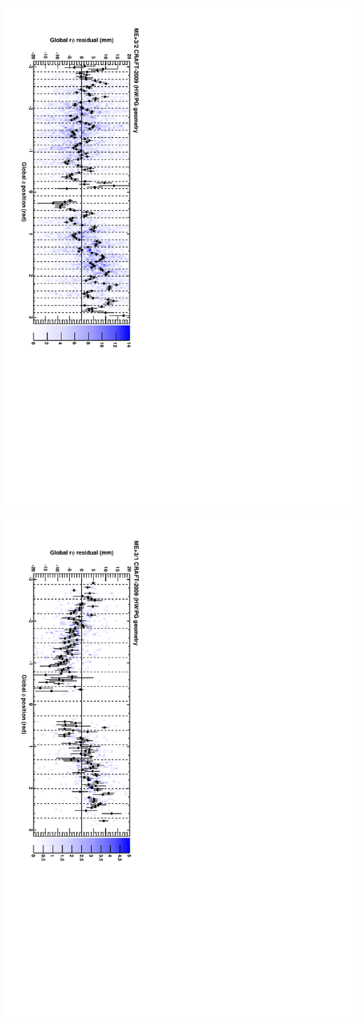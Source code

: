 \documentclass[compress]{beamer}
\begin{document}
\begin{frame}
\vspace{1 cm}
\includegraphics[height=\linewidth, angle=90]{series14.pdf}

\includegraphics[height=\linewidth, angle=90]{series13.pdf}
\end{frame}
\end{document}
